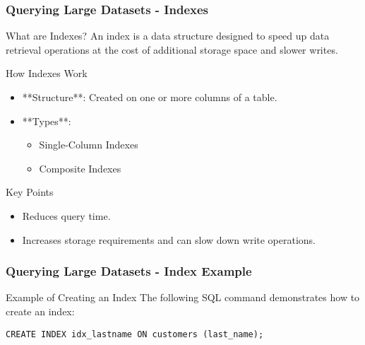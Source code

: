 \documentclass{beamer}
\begin{document}
\begin{frame}
    \frametitle{Querying Large Datasets - Indexes}
    \begin{block}{What are Indexes?}
        An index is a data structure designed to speed up data retrieval operations at the cost of additional storage space and slower writes.
    \end{block}
    
    \begin{block}{How Indexes Work}
        \begin{itemize}
            \item **Structure**: Created on one or more columns of a table.
            \item **Types**:
                \begin{itemize}
                    \item Single-Column Indexes
                    \item Composite Indexes
                \end{itemize}
        \end{itemize}
    \end{block}
    
    \begin{block}{Key Points}
        \begin{itemize}
            \item Reduces query time.
            \item Increases storage requirements and can slow down write operations.
        \end{itemize}
    \end{block}
\end{frame}

\begin{frame}[fragile]
    \frametitle{Querying Large Datasets - Index Example}
    \begin{block}{Example of Creating an Index}
        The following SQL command demonstrates how to create an index:
        \begin{lstlisting}
CREATE INDEX idx_lastname ON customers (last_name);
        \end{lstlisting}
    \end{block}
\end{frame}
\end{document}

